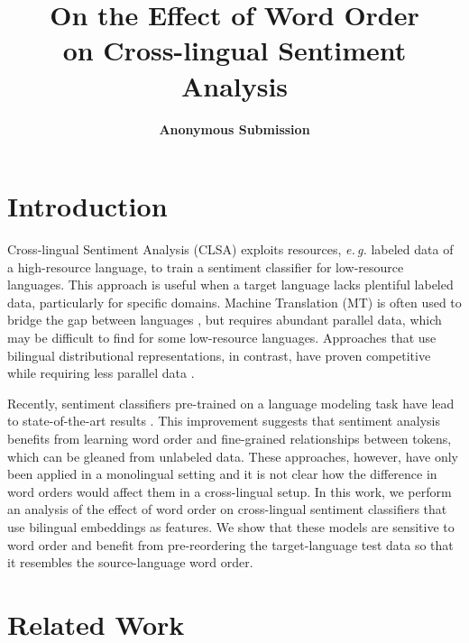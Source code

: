\documentclass[a4paper,11pt,twocolumn,twoside]{article}
\title{On the Effect of Word Order\\on Cross-lingual Sentiment Analysis}
\author {\textbf{Anonymous Submission}
}
\newcommand{\eg}{\textit{e.\,g.}\xspace}
\begin{document}

\setlength\titlebox{16cm} %


\label{firstpage} \maketitle

%


\section{Introduction}


Cross-lingual Sentiment Analysis (CLSA) exploits resources, \eg labeled data of a high-resource language, to train a sentiment classifier for low-resource languages. This approach is useful when a target language lacks plentiful labeled data, particularly for specific domains. Machine Translation (MT) is often used to bridge the gap between languages \cite{Banea2008,Balahur2014d}, but requires abundant parallel data, which may be difficult to find for some low-resource languages. Approaches that use bilingual distributional representations, in contrast, have proven competitive while requiring less parallel data \cite{Chen2016,Barnes2018b}.

Recently, sentiment classifiers pre-trained on a language modeling task have lead to state-of-the-art results \cite{Peters2018,Howard2018,Devlin2018}. This improvement suggests that sentiment analysis benefits from learning word order and fine-grained relationships between tokens, which can be gleaned from unlabeled data. These approaches, however, have only been applied in a monolingual setting and it is not clear how the difference in word orders would affect them in a cross-lingual setup. In this work, we perform an analysis of the effect of word order on cross-lingual sentiment classifiers that use bilingual embeddings as features. We show that these models are sensitive to word order and benefit from pre-reordering the target-language test data so that it resembles the source-language word order.


\section{Related Work}
\end{document}
